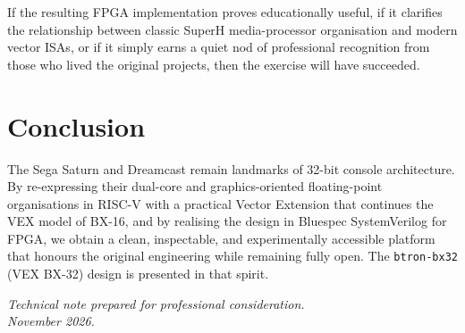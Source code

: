 \documentclass[11pt,a4paper]{article}
\begin{document}
If the resulting FPGA implementation proves educationally useful, if it clarifies the relationship between classic SuperH media-processor organisation and modern vector ISAs, or if it simply earns a quiet nod of professional recognition from those who lived the original projects, then the exercise will have succeeded.

\section{Conclusion}

The Sega Saturn and Dreamcast remain landmarks of 32-bit console architecture. By re-expressing their dual-core and graphics-oriented floating-point organisations in RISC-V with a practical Vector Extension that continues the VEX model of BX-16, and by realising the design in Bluespec SystemVerilog for FPGA, we obtain a clean, inspectable, and experimentally accessible platform that honours the original engineering while remaining fully open. The \texttt{btron-bx32} (VEX BX-32) design is presented in that spirit.

\vspace{1.5em}
\noindent\textit{Technical note prepared for professional consideration.\\
November 2026.}
\end{document}
